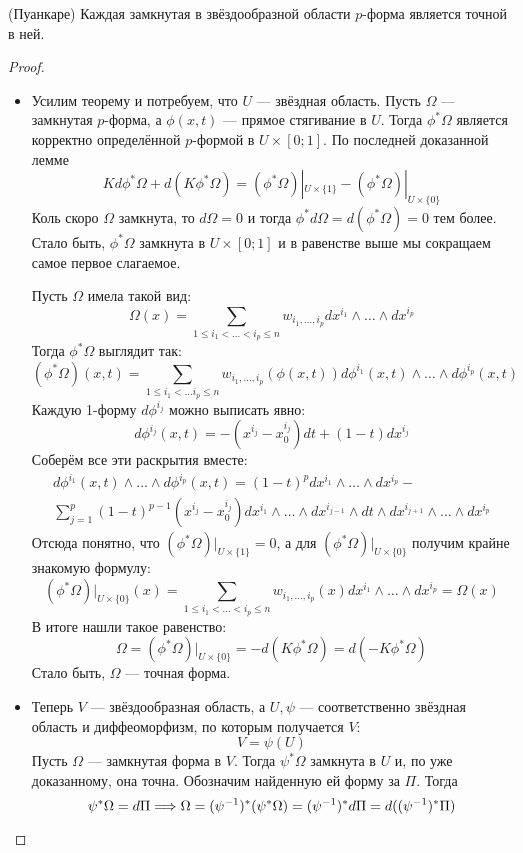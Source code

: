 \begin{lemma} (Пуанкаре)
	Каждая замкнутая в звёздообразной области $p$-форма является точной в ней.
\end{lemma}

\begin{proof}~
	\begin{itemize}
		\item Усилим теорему и потребуем, что $U$ --- звёздная область. Пусть $\Omega$ --- замкнутая $p$-форма, а $\phi(x, t)$ --- прямое стягивание в $U$. Тогда $\phi^*\Omega$ является корректно определённой $p$-формой в $U \times [0; 1]$. По последней доказанной лемме
		\[
			Kd\phi^*\Omega + d(K\phi^*\Omega) = (\phi^*\Omega)|_{U \times \{1\}} - (\phi^*\Omega)|_{U \times \{0\}}
		\]
		Коль скоро $\Omega$ замкнута, то $d\Omega = 0$ и тогда $\phi^*d\Omega = d(\phi^*\Omega) = 0$ тем более. Стало быть, $\phi^*\Omega$ замкнута в $U \times [0; 1]$ и в равенстве выше мы сокращаем самое первое слагаемое.
		
		Пусть $\Omega$ имела такой вид:
		\[
			\Omega(x) = \sum_{1 \le i_1 < \ldots < i_p \le n} w_{i_1, \ldots, i_p} dx^{i_1} \wedge \ldots \wedge dx^{i_p}
		\]
		Тогда $\phi^*\Omega$ выглядит так:
		\[
			(\phi^*\Omega)(x, t) = \sum_{1 \le i_1 < \ldots i_p \le n} w_{i_1, \ldots, i_p}(\phi(x, t))d\phi^{i_1}(x, t) \wedge \ldots \wedge d\phi^{i_p}(x, t)
		\]
		Каждую 1-форму $d\phi^{i_j}$ можно выписать явно:
		\[
			d\phi^{i_j}(x, t) = -(x^{i_j} - x_0^{i_j})dt + (1 - t)dx^{i_j}
		\]
		Соберём все эти раскрытия вместе:
		\begin{multline*}
			d\phi^{i_1}(x, t) \wedge \ldots \wedge d\phi^{i_p}(x, t) = (1 - t)^p dx^{i_1} \wedge \ldots \wedge dx^{i_p} -
			\\
			\sum_{j = 1}^p (1 - t)^{p - 1} (x^{i_j} - x_0^{i_j}) dx^{i_1} \wedge \ldots \wedge dx^{i_{j - 1}} \wedge dt \wedge dx^{i_{j + 1}} \wedge \ldots \wedge dx^{i_p}
		\end{multline*}
		Отсюда понятно, что $(\phi^*\Omega)|_{U \times \{1\}} = 0$, а для $(\phi^*\Omega)|_{U \times \{0\}}$ получим крайне знакомую формулу:
		\[
			(\phi^*\Omega)|_{U \times \{0\}}(x) = \sum_{1 \le i_1 < \ldots < i_p \le n} w_{i_1, \ldots, i_p}(x) dx^{i_1} \wedge \ldots \wedge dx^{i_p} = \Omega(x)
		\]
		В итоге нашли такое равенство:
		\[
			\Omega = (\phi^*\Omega)|_{U \times \{0\}} = -d(K\phi^*\Omega) = d(-K\phi^*\Omega)
		\]
		Стало быть, $\Omega$ --- точная форма.
		
		\item Теперь $V$ --- звёздообразная область, а $U, \psi$ --- соответственно звёздная область и диффеоморфизм, по которым получается $V$:
		\[
			V = \psi(U)
		\]
		Пусть $\Omega$ --- замкнутая форма в $V$. Тогда $\psi^*\Omega$ замкнута в $U$ и, по уже доказанному, она точна. Обозначим найденную ей форму за $\Pi$. Тогда
		\[
			\psi^*\Omega = d\Pi \Longrightarrow \Omega = (\psi^{-1})^*(\psi^*\Omega) = (\psi^{-1})^*d\Pi = d((\psi^{-1})^*\Pi)
		\]
	\end{itemize}
\end{proof}

